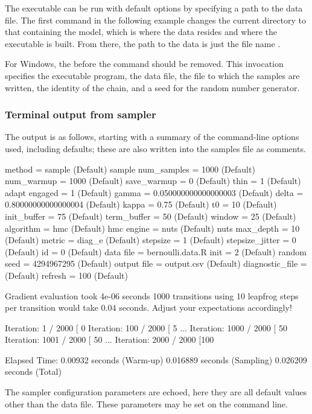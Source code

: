\documentclass[article]{jss}
\begin{document}
The executable can be run with default options by specifying a path to
the data file.  The first command in the following example changes the
current directory to that containing the model, which is where the
data resides and where the executable is built.  From there, the path
to the data is just the file name .
%
\begin{CodeChunk}
\end{CodeChunk}
%
For Windows, the  before the command should be removed.  This
invocation specifies the executable program, the data file, the file
to which the samples are written, the identity of the chain, and a
seed for the random number generator.

\subsubsection{Terminal output from sampler}

The output is as follows, starting with a summary of the command-line
options used, including defaults;  these are also written into the 
samples file as comments.
%
\begin{Code}
 method = sample (Default)
   sample
     num_samples = 1000 (Default)
     num_warmup = 1000 (Default)
     save_warmup = 0 (Default)
     thin = 1 (Default)
     adapt
       engaged = 1 (Default)
       gamma = 0.050000000000000003 (Default)
       delta = 0.80000000000000004 (Default)
       kappa = 0.75 (Default)
       t0 = 10 (Default)
       init_buffer = 75 (Default)
       term_buffer = 50 (Default)
       window = 25 (Default)
     algorithm = hmc (Default)
       hmc
         engine = nuts (Default)
           nuts
             max_depth = 10 (Default)
         metric = diag_e (Default)
         stepsize = 1 (Default)
         stepsize_jitter = 0 (Default)
 id = 0 (Default)
 data
   file = bernoulli.data.R
 init = 2 (Default)
 random
   seed = 4294967295 (Default)
 output
   file = output.csv (Default)
   diagnostic_file =  (Default)
   refresh = 100 (Default)

Gradient evaluation took 4e-06 seconds
1000 transitions using 10 leapfrog steps per transition would take 0.04 seconds.
Adjust your expectations accordingly!

Iteration:    1 / 2000 [  0%
Iteration:  100 / 2000 [  5%
...
Iteration: 1000 / 2000 [ 50%
Iteration: 1001 / 2000 [ 50%
...
Iteration: 2000 / 2000 [100%

  Elapsed Time: 0.00932 seconds (Warm-up)
                0.016889 seconds (Sampling)
                0.026209 seconds (Total)
\end{Code}
%
The sampler configuration parameters are echoed, here they are all
default values other than the data file.  These parameters may be set
on the command line.  
\end{document}
